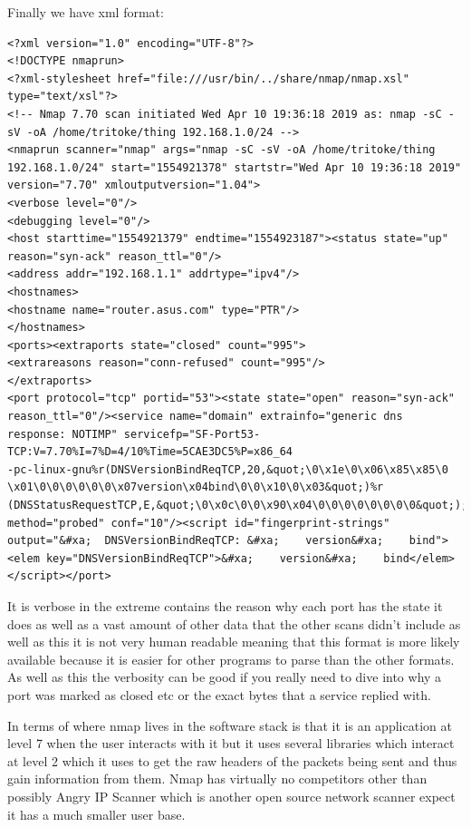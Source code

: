 \documentclass[titlepage]{article}
\begin{document}
Finally we have \gls{xml} format:
\lstset{language=xml}
\begin{lstlisting}
<?xml version="1.0" encoding="UTF-8"?>
<!DOCTYPE nmaprun>
<?xml-stylesheet href="file:///usr/bin/../share/nmap/nmap.xsl" type="text/xsl"?>
<!-- Nmap 7.70 scan initiated Wed Apr 10 19:36:18 2019 as: nmap -sC -sV -oA /home/tritoke/thing 192.168.1.0/24 -->
<nmaprun scanner="nmap" args="nmap -sC -sV -oA /home/tritoke/thing 192.168.1.0/24" start="1554921378" startstr="Wed Apr 10 19:36:18 2019" version="7.70" xmloutputversion="1.04">
<verbose level="0"/>
<debugging level="0"/>
<host starttime="1554921379" endtime="1554923187"><status state="up" reason="syn-ack" reason_ttl="0"/>
<address addr="192.168.1.1" addrtype="ipv4"/>
<hostnames>
<hostname name="router.asus.com" type="PTR"/>
</hostnames>
<ports><extraports state="closed" count="995">
<extrareasons reason="conn-refused" count="995"/>
</extraports>
<port protocol="tcp" portid="53"><state state="open" reason="syn-ack" reason_ttl="0"/><service name="domain" extrainfo="generic dns response: NOTIMP" servicefp="SF-Port53-TCP:V=7.70%I=7%D=4/10%Time=5CAE3DC5%P=x86_64
-pc-linux-gnu%r(DNSVersionBindReqTCP,20,&quot;\0\x1e\0\x06\x85\x85\0
\x01\0\0\0\0\0\0\x07version\x04bind\0\0\x10\0\x03&quot;)%r
(DNSStatusRequestTCP,E,&quot;\0\x0c\0\0\x90\x04\0\0\0\0\0\0\0\0&quot;);" method="probed" conf="10"/><script id="fingerprint-strings" output="&#xa;  DNSVersionBindReqTCP: &#xa;    version&#xa;    bind"><elem key="DNSVersionBindReqTCP">&#xa;    version&#xa;    bind</elem>
</script></port>
\end{lstlisting}
It is verbose in the extreme contains the reason why each port has the state it does as well as a
vast amount of other data that the other scans didn't include as well as this it is not very human
readable meaning that this format is more likely available because it is easier for other programs
to parse than the other formats. As well as this the verbosity can be good if you really need to
dive into why a port was marked as closed etc or the exact bytes that a service replied with.

In terms of where nmap lives in the software stack is that it is an application at level 7 when the
user interacts with it but it uses several libraries which interact at level 2 which it uses to get
the raw headers of the packets being sent and thus gain information from them.
Nmap has virtually no competitors other than possibly Angry IP Scanner which
is another open source network scanner expect it has a much smaller user base.
\end{document}
